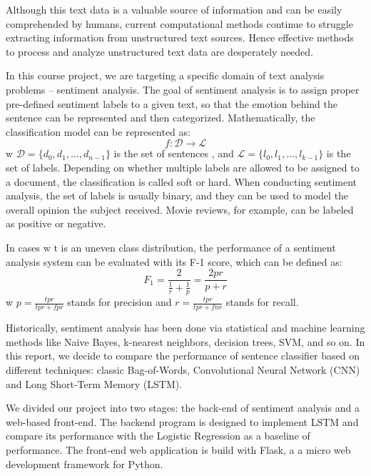 \documentclass[conference]{IEEEtran}
\begin{document}
    Although this text data is a valuable source of information
    and can be easily comprehended by humans, current computational methods
    continue to struggle extracting information from unstructured text 
    sources.
    Hence effective methods to process and analyze unstructured text data are
    desperately needed.

    In this course project, we are targeting a specific domain of text analysis
    problems -- sentiment analysis. The goal of sentiment analysis is to assign
    proper pre-defined sentiment labels to a given text, so that the emotion behind the
    sentence can be represented and then categorized\cite{allahyari2017brief}.
    Mathematically, the classification model can be represented as:
    $$f:\mathcal{D}\rightarrow\mathcal{L}$$
    w $\mathcal{D}=\{d_0, d_1,\ldots, d_{n-1}\}$ is the set of sentences
    , and $\mathcal{L}=\{l_0, l_1,\ldots, l_{k-1}\}$ is the set of labels.
    Depending on whether multiple labels are allowed to be assigned to a document, the
    classification is called soft or hard\cite{gopal2010multilabel}. When conducting sentiment 
    analysis, the set of labels is usually binary, and they can be used
    to model the overall opinion the subject received. Movie reviews, for example,
    can be labeled as positive or negative\cite{pang2002thumbs}.

    In cases w t is an uneven class distribution, the performance
    of a sentiment analysis system can be evaluated with its
    F-1 score, which can be defined as\cite{forman2003extensive}:
    $$F_1=\frac{2}{\frac{1}{r}+\frac{1}{p}}=\frac{2pr}{p+r}$$
    w $p=\frac{tpr}{tpr+fpr}$ stands for precision and $r=\frac{tpr}{tpr+fnr}$
    stands for recall.

    Historically, sentiment analysis has been done via statistical
    and machine learning methods like Naive Bayes, k-nearest neighbors, decision
    trees, SVM, and so on. In this report, we decide to compare the performance of
    sentence classifier based on different techniques: 
    classic Bag-of-Words\cite{pang2002thumbs},
    Convolutional Neural Network (CNN)\cite{kim2014convolutional} 
    and Long Short-Term Memory (LSTM)\cite{barnes2017assessing}.
    
    We divided our project into two stages: the back-end of sentiment analysis
    and a web-based front-end. The backend program is designed to implement 
    LSTM and compare its performance with the Logistic Regression as a baseline
    of performance. The front-end web application is build with Flask, a 
    a micro web development framework for Python.
    
\end{document}
